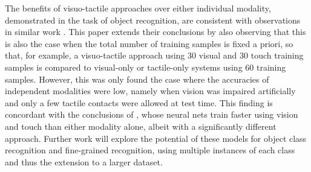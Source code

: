 \documentclass[9pt,technote]{IEEEtran}  %
\begin{document}
The benefits of visuo-tactile approaches over either individual modality, demonstrated in the task of object recognition, are consistent with observations in similar work \cite{Yang2015}. This paper extends their conclusions by also observing that this is also the case when the total number of training samples is fixed a priori, so that, for example, a visuo-tactile approach using 30 visual and 30 touch training samples is compared to visual-only or tactile-only systems using 60 training samples. However, this was only found the case where the accuracies of independent modalities were low, namely when vision was impaired artificially and only a few tactile contacts were allowed at test time. This finding is concordant with the conclusions of \cite{Kim2004}, whose neural nets train faster using vision and touch than either modality alone, albeit with a significantly different approach. Further work will explore the potential of these models for object class recognition and fine-grained recognition, using multiple instances of each class and thus the extension to a larger dataset.
	



	
\end{document}
